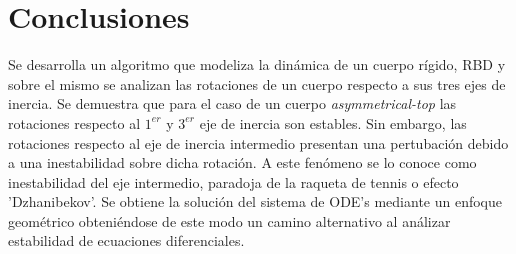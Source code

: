 \documentclass[oneside,a4paper,english,links]{amca}
\begin{document}

\section{Conclusiones}

Se desarrolla un algoritmo que modeliza la din\'amica de un cuerpo r\'igido, RBD y sobre el mismo se analizan las rotaciones de un cuerpo respecto a sus tres ejes de inercia. Se demuestra que para el caso de un cuerpo \textit{asymmetrical-top} las rotaciones respecto al $1^{er}$ y $3^{er}$ eje de inercia son estables. Sin embargo, las rotaciones respecto al eje de inercia intermedio presentan una pertubaci\'on debido a una inestabilidad sobre dicha rotaci\'on. A este fen\'omeno se lo conoce como inestabilidad del eje intermedio, paradoja de la raqueta de tennis o efecto 'Dzhanibekov'. Se obtiene la soluci\'on del sistema de ODE's mediante un enfoque geom\'etrico obteni\'endose de este modo un camino alternativo al an\'alizar estabilidad de ecuaciones diferenciales.


\newpage



\end{document}
